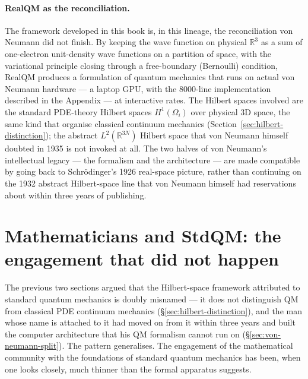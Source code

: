 \paragraph{RealQM as the reconciliation.}
The framework developed in this book is, in this lineage, the reconciliation von Neumann did not finish. By keeping the wave function on physical $\mathbb{R}^3$ as a sum of one-electron unit-density wave functions on a partition of space, with the variational principle closing through a free-boundary (Bernoulli) condition, RealQM produces a formulation of quantum mechanics that runs on actual von Neumann hardware --- a laptop GPU, with the 8000-line implementation described in the Appendix --- at interactive rates. The Hilbert spaces involved are the standard PDE-theory Hilbert spaces $H^1(\Omega_i)$ over physical 3D space, the same kind that organise classical continuum mechanics (Section~\ref{sec:hilbert-distinction}); the abstract $L^2(\mathbb{R}^{3N})$ Hilbert space that von Neumann himself doubted in 1935 is not invoked at all. The two halves of von Neumann's intellectual legacy --- the formalism and the architecture --- are made compatible by going back to Schr\"odinger's 1926 real-space picture, rather than continuing on the 1932 abstract Hilbert-space line that von Neumann himself had reservations about within three years of publishing.

\section{Mathematicians and StdQM: the engagement that did not happen}\label{sec:mathematicians-and-stdqm}

The previous two sections argued that the Hilbert-space framework attributed to standard quantum mechanics is doubly misnamed --- it does not distinguish QM from classical PDE continuum mechanics (\S\ref{sec:hilbert-distinction}), and the man whose name is attached to it had moved on from it within three years and built the computer architecture that his QM formalism cannot run on (\S\ref{sec:von-neumann-split}). The pattern generalises. The engagement of the mathematical community with the foundations of standard quantum mechanics has been, when one looks closely, much thinner than the formal apparatus suggests.

